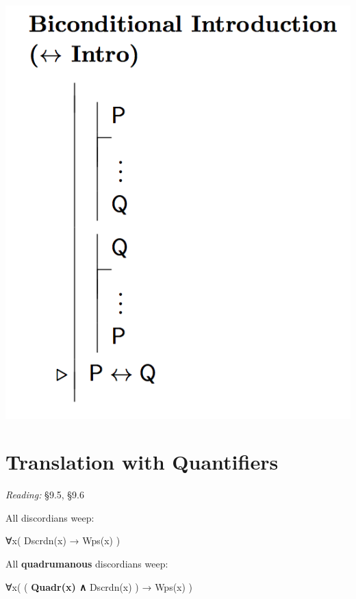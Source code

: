 \documentclass[12pt]{extarticle}
\begin{document}
\begin{multicols*}{3}
\begin{center}
\includegraphics[scale=0.3]{img/rule_biconditional_intro.png}
\end{center}
 
 
\section{Translation with Quantifiers}
 
\emph{Reading:} §9.5, §9.6
 
\begin{minipage}{\columnwidth}
 
All discordians weep:
 
∀x( Dscrdn(x) → Wps(x) )
 
\end{minipage}
 
\begin{minipage}{\columnwidth}
 
All \textbf{quadrumanous} discordians weep:
 
∀x( ( \textbf{Quadr(x) ∧} Dscrdn(x) ) → Wps(x) )
 
\end{minipage}
 

\end{multicols*}
\end{document}
